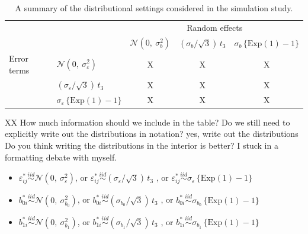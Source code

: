 \documentclass[12pt]{article} %
\newcommand{\hh}[1]{{\color{orange} #1}}
\newcommand{\al}[1]{{\color{red} #1}}
\begin{document}
\begin{table}[htdp]
\centering
\caption{\label{tab:simdsns} A summary of the distributional settings considered in the simulation study.}
\begin{tabular}{llccc}\hline
& & \multicolumn{3}{c}{Random effects} \\ 
           & & $\mathcal{N}(0, \ \sigma^2_{b})$ & $(\sigma_{b} / \sqrt{3})\, t_3$ & $\sigma_{b} \, \{ \text{Exp}(1) - 1 \}$ \\ \hline
Error terms  & $\mathcal{N}(0, \ \sigma^2_{\varepsilon})$       & X & X & X \\
             & $(\sigma_{\varepsilon} / \sqrt{3})\, t_3$  & X & X & X \\
             & $\sigma_{\varepsilon} \, \{ \text{Exp}(1) - 1 \}$       & X & X & X \\ 
\hline
\end{tabular} 
\end{table}
\al{XX How much information should we include in the table? Do we still need to explicitly write out the distributions in notation?}
\hh{yes, write out the distributions} \al{Do you think writing the distributions in the interior is better? I stuck in a formatting debate with myself.}

\begin{itemize}
\item $\varepsilon_{ij}^* \overset{iid}{\sim} \mathcal{N}(0, \ \sigma^2_{\varepsilon})$, or $\varepsilon_{ij}^* \overset{iid}{\sim} (\sigma_{\varepsilon} / \sqrt{3})\, t_3$ , or $\varepsilon_{ij}^* \overset{iid}{\sim} \sigma_{\varepsilon} \, \{ \text{Exp}(1) - 1 \}$

\item $b_{0i}^* \overset{iid}{\sim} \mathcal{N}(0, \ \sigma^2_{b_{0}})$, or $b_{0i}^* \overset{iid}{\sim} (\sigma_{b_{0}} / \sqrt{3})\, t_3$ , or $b_{0i}^* \overset{iid}{\sim} \sigma_{b_{0}} \, \{ \text{Exp}(1) - 1 \}$

\item $b_{1i}^* \overset{iid}{\sim} \mathcal{N}(0, \ \sigma^2_{b_{1}})$, or $b_{1i}^* \overset{iid}{\sim} (\sigma_{b_{1}} / \sqrt{3})\, t_3$ , or $b_{1i}^* \overset{iid}{\sim} \sigma_{b_{1}} \, \{ \text{Exp}(1) - 1 \}$
\end{itemize}
\end{document}
